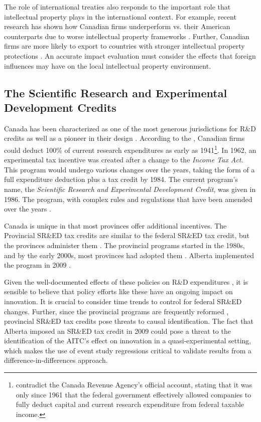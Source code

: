 \documentclass[../main.tex]{subfiles}
\begin{document}
The role of international treaties also responds to the important role that intellectual property plays in the international context. For example, recent research has shown how Canadian firms underperform vs. their American counterparts due to worse intellectual property frameworks \parencite{carew_etal06}. Further, Canadian firms are more likely to export to countries with stronger intellectual property protections \parencite{rafiquzzaman02}. An accurate impact evaluation must consider the effects that foreign influences may have on the local intellectual property environment.

\subsection{The Scientific Research and Experimental Development Credits}

Canada has been characterized as one of the most generous jurisdictions for R\&D credits \parencite{mckenzie08} as well as a pioneer in their design \parencite{mansfield_switzer85a}. According to the \textcite{canadarevenueagency23}, Canadian firms could deduct 100\% of current research expenditures as early as 1941\footnote{\textcite{mansfield_switzer85a} contradict the Canada Revenue Agency's official account, stating that it was only since 1961 that the federal government effectively allowed companies to fully deduct capital and current research expenditure from federal taxable income.}. In 1962, an experimental tax incentive was created after a change to the \textit{Income Tax Act}. This program would undergo various changes over the years, taking the form of a full expenditure deduction plus a tax credit by 1984. The current program's name, the \textit{Scientific Research and Experimental Development Credit}, was given in 1986. The program, with complex rules and regulations that have been amended over the years \parencite{canadarevenueagency15}.

Canada is unique in that most provinces offer additional incentives. The Provincial SR\&ED tax credits are similar to the federal SR\&ED tax credit, but the provinces administer them \parencite{warda00}. The provincial programs started in the 1980s, and by the early 2000s, most provinces had adopted them \parencite{warda98,mckenzie05}. Alberta implemented the program in 2009 \parencite{brouillete13}.

Given the well-documented effects of these policies on R\&D expenditures \parencite{mansfield_switzer85b, agrawal_etal20, becker15}, it is sensible to believe that policy efforts like these have an ongoing impact on innovation. It is crucial to consider time trends to control for federal SR\&ED changes. Further, since the provincial programs are frequently reformed \parencite{mckenzie05}, provincial SR\&ED tax credits pose threats to causal identification. The fact that Alberta imposed an SR\&ED tax credit in 2009 could pose a threat to the identification of the AITC's effect on innovation in a quasi-experimental setting, which makes the use of event study regressions critical to validate results from a difference-in-differences approach.
\end{document}
